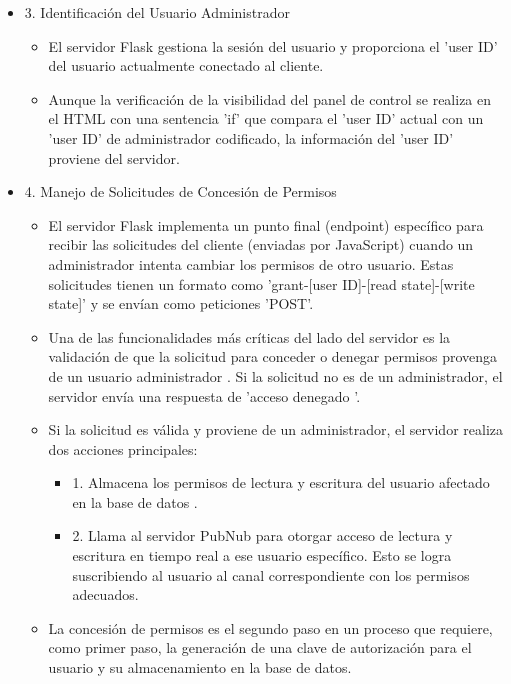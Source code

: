\documentclass{report}
\begin{document}
\begin{itemize}
    \item 3. Identificación del Usuario Administrador
    \begin{itemize}
        \item El servidor Flask gestiona la sesión del usuario y proporciona el 'user ID' del usuario actualmente conectado al cliente.
        \item Aunque la verificación de la visibilidad del panel de control se realiza en el HTML con una sentencia 'if' que compara el 'user ID' 
        actual con un 'user ID' de administrador codificado, la información del 'user ID' proviene del servidor.
    \end{itemize}

    \item 4. Manejo de Solicitudes de Concesión de Permisos
    \begin{itemize}
        \item El servidor Flask implementa un  punto final (endpoint) específico  para recibir las solicitudes del cliente (enviadas por JavaScript) 
        cuando un administrador intenta cambiar los permisos de otro usuario. Estas solicitudes tienen un formato como 
        'grant-[user ID]-[read state]-[write state]' y se envían como peticiones 'POST'.
        \item Una de las funcionalidades más críticas del lado del servidor es la  validación de que la solicitud para conceder o denegar permisos 
        provenga de un usuario administrador . Si la solicitud no es de un administrador, el servidor envía una respuesta de  'acceso denegado '.
        \item Si la solicitud es válida y proviene de un administrador, el servidor realiza dos acciones principales:
        \begin{itemize}
            \item 1.   Almacena los permisos  de lectura y escritura del usuario afectado  en la base de datos .
            \item 2.   Llama al servidor PubNub  para  otorgar acceso de lectura y escritura en tiempo real  a ese usuario específico. Esto se logra 
            suscribiendo al usuario al canal correspondiente con los permisos adecuados.
        \end{itemize}
        \item La concesión de permisos es el  segundo paso  en un proceso que requiere, como primer paso, la  generación de una clave de autorización  
        para el usuario y su almacenamiento en la base de datos.
    \end{itemize}


\end{itemize}
\end{document}
